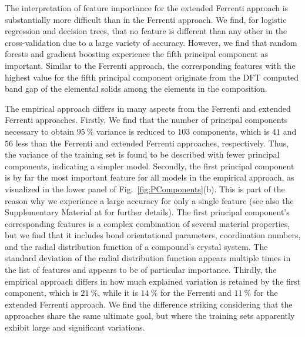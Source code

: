 \documentclass[superscriptaddress,unsortedaddress,
 amsmath,amssymb,
 aps,
]{revtex4-2}
\begin{document}
The interpretation of feature importance for the extended Ferrenti approach is substantially more difficult than in the Ferrenti approach. We find, for logistic regression and decision trees, that no feature is different than any other in the cross-validation due to a large variety of accuracy. However, we find that random forests and gradient boosting experience the fifth principal component as important. Similar to the Ferrenti approach, the corresponding features with the highest value for the fifth principal component originate from the DFT computed band gap of the elemental solids among the elements in the composition. 

The empirical approach differs in many aspects from the Ferrenti and extended Ferrenti approaches. 
Firstly, We find that the number of principal components necessary to obtain $95 \ \%$ variance is reduced to $103$ components, which is $41$ and $56$ less than the Ferrenti and extended Ferrenti approaches, respectively. Thus, the variance of the training set is found to be described with fewer principal components, indicating a simpler model.   
Secondly, the first principal component is by far the most important feature for all models in the empirical approach, as visualized in the lower panel of Fig.~\ref{fig:PComponents}(b). 
This is part of the reason why we experience a large accuracy for only a single feature (see also the Supplementary Material at \cite{supplementary} for further details). The first principal component's corresponding features is a complex combination of several material properties, but we find that it includes bond orientational parameters, coordination numbers, and the radial distribution function of a compound's crystal system. 
The standard deviation of the radial distribution function appears multiple times in the list of features and appears to be of particular importance. 
Thirdly, the empirical approach differs in how much explained variation is retained by the first component, which is $21 \ \%$, while it is $14 \ \%$ for the Ferrenti  and $11 \ \%$ for the extended Ferrenti approach. We find the difference striking considering that the approaches share the same ultimate goal, but where the training sets apparently exhibit large and significant variations. 
\end{document}
